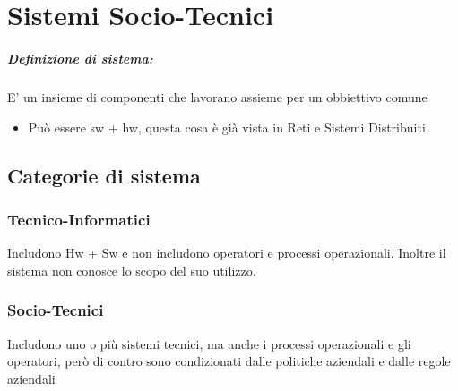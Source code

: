 \documentclass[12pt, a4paper, openany, twoside]{book}
\begin{document}
\chapter{Sistemi Socio-Tecnici}
\paragraph{Definizione di sistema:} E' un insieme di componenti che lavorano 
assieme per un obbiettivo comune
\begin{itemize}
	\item Può essere sw + hw, questa cosa è già vista in Reti e Sistemi Distribuiti
\end{itemize}
\section{Categorie di sistema}
\subsection{Tecnico-Informatici} Includono Hw + Sw e non includono operatori e 
processi operazionali. Inoltre il sistema non conosce lo scopo del suo utilizzo.
\subsection{Socio-Tecnici} Includono uno o più sistemi tecnici, ma anche i 
processi operazionali e gli operatori, però di contro sono condizionati dalle
politiche aziendali e dalle regole aziendali
\end{document}
